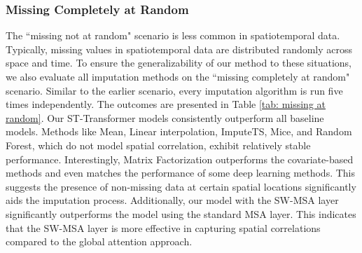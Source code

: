 \documentclass[review]{elsarticle}
\begin{document}
\subsubsection*{Missing Completely at Random}
The ``missing not at random" scenario is less common in spatiotemporal data. Typically, missing values in spatiotemporal data are distributed randomly across space and time. To ensure the generalizability of our method to these situations, we also evaluate all imputation methods on the ``missing completely at random" scenario. Similar to the earlier scenario, every imputation algorithm is run five times independently. The outcomes are presented in Table \ref{tab: missing at random}. Our ST-Transformer models consistently outperform all baseline models. Methods like Mean, Linear interpolation, ImputeTS, Mice, and Random Forest, which do not model spatial correlation, exhibit relatively stable performance. Interestingly, Matrix Factorization outperforms the covariate-based methods and even matches the performance of some deep learning methods. This suggests the presence of non-missing data at certain spatial locations significantly aids the imputation process. Additionally, our model with the SW-MSA layer significantly outperforms the model using the standard MSA layer. This indicates that the SW-MSA layer is more effective in capturing spatial correlations compared to the global attention approach.
\end{document}
